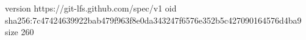 version https://git-lfs.github.com/spec/v1
oid sha256:7c47424639922bab479f963f8e0da343247f6576e352b5c427090164576d4ba9
size 260
